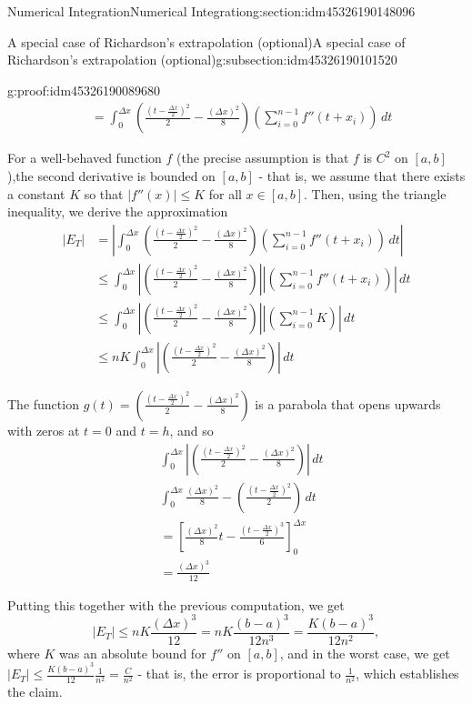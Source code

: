 \documentclass[oneside,10pt,]{article}
\numberwithin{equation}{section}
\newcommand{\abs}[1]{\left\vert#1\right\vert}
\numberwithin{equation}{section}
\newcommand{\amp}{&}
\begin{document}
\begin{sectionptx}{Numerical Integration}{}{Numerical Integration}{}{}{g:section:idm45326190148096}
\begin{subsectionptx}{A special case of Richardson's extrapolation (optional)}{}{A special case of Richardson's extrapolation (optional)}{}{}{g:subsection:idm45326190101520}
\begin{proofptx}{}{g:proof:idm45326190089680}
\begin{align*}
\amp =\int_0^{\Delta x} \left(\frac{(t - \frac{\Delta x}{2})^2}{2} - \frac{(\Delta x)^2}{8}\right) \left(\sum_{i = 0}^{n-1} f''(t + x_i)\right) \, dt
\end{align*}
%
\par
For a well-behaved function \(f\) (the precise assumption is that \(f\) is \(C^2\) on \([a,b]\)),the second derivative is bounded on \([a,b]\) - that is, we assume that there exists a constant \(K\) so that \(\abs{f''(x)} \leq K\) for all \(x \in [a,b]\). Then, using the triangle inequality, we derive the approximation%
\begin{align*}
\abs{E_T} \amp= \abs{\int_0^{\Delta x} \left(\frac{(t - \frac{\Delta x}{2})^2}{2} - \frac{(\Delta x)^2}{8}\right) \left(\sum_{i = 0}^{n-1} f''(t + x_i)\right)\, dt}\\
\amp \leq \int_0^{\Delta x} \abs{\left(\frac{(t - \frac{\Delta x}{2})^2}{2} - \frac{(\Delta x)^2}{8}\right)} \abs{\left(\sum_{i = 0}^{n-1} f''(t + x_i)\right)}\, dt\\
\amp\leq \int_0^{\Delta x} \abs{\left(\frac{(t - \frac{\Delta x}{2})^2}{2} - \frac{(\Delta x)^2}{8}\right)} \abs{\left(\sum_{i = 0}^{n-1} K \right)}\, dt\\
\amp \leq nK \int_0^{\Delta x} \abs{\left(\frac{(t - \frac{\Delta x}{2})^2}{2} - \frac{(\Delta x)^2}{8}\right)} \, dt 
\end{align*}
%
\par
The function \(g(t) =\left(\frac{(t - \frac{\Delta x}{2})^2}{2} - \frac{(\Delta x)^2}{8}\right)\) is a parabola that opens upwards with zeros at \(t = 0\) and \(t = h\), and so%
\begin{align*}
\amp \int_0^{\Delta x} \abs{\left(\frac{(t - \frac{\Delta x}{2})^2}{2} - \frac{(\Delta x)^2}{8}\right)} \, dt\\
\amp \int_0^{\Delta x} \frac{(\Delta x)^2}{8} - \left(\frac{(t - \frac{\Delta x}{2})^2}{2} \right) \, dt\\
\amp = \left[\frac{(\Delta x)^2}{8}t - \frac{(t - \frac{\Delta x}{2})^3}{6}\right]_0^{\Delta x} \\
\amp= \frac{(\Delta x)^3}{12}
\end{align*}
%
\par
Putting this together with the previous computation, we get%
\begin{equation*}
\abs{E_T} \leq nK\frac{(\Delta x)^3}{12} = nK \frac{(b-a)^3}{12 n^3} = \frac{K(b-a)^3}{12 n^2},
\end{equation*}
where \(K\) was an absolute bound for \(f''\) on \([a,b]\), and in the worst case, we get \(\abs{E_T} \leq \frac{K(b-a)^3}{12} \frac{1}{n^2} = \frac{C}{n^2}\) - that is, the error is proportional to \(\frac{1}{n^2}\), which establishes the claim.%

\end{proofptx}
\end{subsectionptx}
\end{sectionptx}
\end{document}
